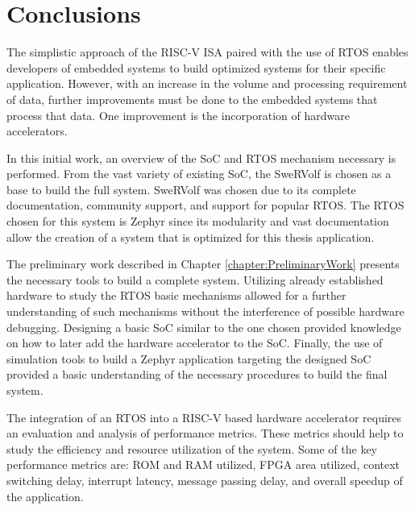 
\chapter{Conclusions}
\label{chapter:conclusions}
The simplistic approach of the RISC-V ISA paired with the use of RTOS enables developers of embedded systems to build optimized systems for their specific application. However, with an increase in the volume and processing requirement of data, further improvements must be done to the embedded systems that process that data. One improvement is the incorporation of hardware accelerators. 

In this initial work, an overview of the SoC and RTOS mechanism necessary is performed. From the vast variety of existing SoC, the SweRVolf is chosen as a base to build the full system. SweRVolf was chosen due to its complete documentation, community support, and support for popular RTOS. The RTOS chosen for this system is Zephyr since its modularity and vast documentation allow the creation of a system that is optimized for this thesis application.

The preliminary work described in Chapter \ref{chapter:PreliminaryWork} presents the necessary tools to build a complete system. Utilizing already established hardware to study the RTOS basic mechanisms allowed for a further understanding of such mechanisms without the interference of possible hardware debugging. Designing a basic SoC similar to the one chosen provided knowledge on how to later add the hardware accelerator to the SoC. Finally, the use of simulation tools to build a Zephyr application targeting the designed SoC provided a basic understanding of the necessary procedures to build the final system.

The integration of an RTOS into a RISC-V based hardware accelerator requires an evaluation and analysis of performance metrics. These metrics should help to study the efficiency and resource utilization of the system. Some of the key performance metrics are: ROM and RAM utilized, FPGA area utilized, context switching delay, interrupt latency, message passing delay, and overall speedup of the application.


